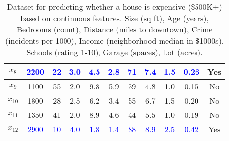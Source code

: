\begin{example}
\begin{table}[H]
{\begin{tabular}{|c|c|c|c|c|c|c|c|c|c|c|}
        \hline
        $x_8$ & \textcolor{blue}{2200} & \textcolor{blue}{22} & \textcolor{blue}{3.0} & \textcolor{blue}{4.5} & \textcolor{blue}{2.8} & \textcolor{blue}{71} & \textcolor{blue}{7.4} & \textcolor{blue}{1.5} & \textcolor{blue}{0.26} & Yes \\
        \hline
        $x_9$ & \textcolor{green!50!black}{1100} & \textcolor{green!50!black}{55} & \textcolor{green!50!black}{2.0} & \textcolor{green!50!black}{9.8} & \textcolor{green!50!black}{5.9} & \textcolor{green!50!black}{39} & \textcolor{green!50!black}{4.8} & \textcolor{green!50!black}{1.0} & \textcolor{green!50!black}{0.15} & No \\
        \hline
        $x_{10}$ & \textcolor{green!50!black}{1800} & \textcolor{green!50!black}{28} & \textcolor{green!50!black}{2.5} & \textcolor{green!50!black}{6.2} & \textcolor{green!50!black}{3.4} & \textcolor{green!50!black}{55} & \textcolor{green!50!black}{6.7} & \textcolor{green!50!black}{1.5} & \textcolor{green!50!black}{0.20} & No \\
        \hline
        $x_{11}$ & \textcolor{green!50!black}{1350} & \textcolor{green!50!black}{41} & \textcolor{green!50!black}{2.0} & \textcolor{green!50!black}{8.9} & \textcolor{green!50!black}{4.6} & \textcolor{green!50!black}{44} & \textcolor{green!50!black}{5.5} & \textcolor{green!50!black}{1.0} & \textcolor{green!50!black}{0.19} & No \\
        \hline
        $x_{12}$ & \textcolor{blue}{2900} & \textcolor{blue}{10} & \textcolor{blue}{4.0} & \textcolor{blue}{1.8} & \textcolor{blue}{1.4} & \textcolor{blue}{88} & \textcolor{blue}{8.9} & \textcolor{blue}{2.5} & \textcolor{blue}{0.42} & Yes \\
        \hline
      \end{tabular}
      }
      \caption{Dataset for predicting whether a house is expensive (\$500K+) based on continuous features. Size (sq ft), Age (years), Bedrooms (count), Distance (miles to downtown), Crime (incidents per 1000), Income (neighborhood median in \$1000s), Schools (rating 1-10), Garage (spaces), Lot (acres).}
      \label{tab:housing}
    \end{table}


\end{example}
